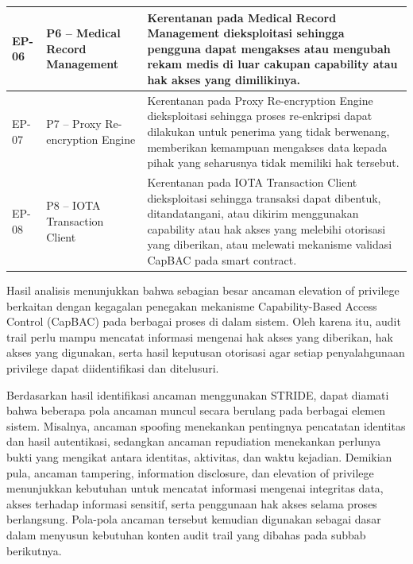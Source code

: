 \begin{xltabular}{\textwidth}{|>{\centering\arraybackslash}p{1.8cm}|>{\raggedright\arraybackslash}p{3.2cm}|X|}
    EP-06 &
    P6 -- Medical Record Management &
    Kerentanan pada Medical Record Management dieksploitasi sehingga pengguna dapat mengakses atau mengubah rekam medis di luar cakupan capability atau hak akses yang dimilikinya. \\
    \hline

    EP-07 &
    P7 -- Proxy Re-encryption Engine &
    Kerentanan pada Proxy Re-encryption Engine dieksploitasi sehingga proses re-enkripsi dapat dilakukan untuk penerima yang tidak berwenang, memberikan kemampuan mengakses data kepada pihak yang seharusnya tidak memiliki hak tersebut. \\
    \hline

    EP-08 &
    P8 -- IOTA Transaction Client &
    Kerentanan pada IOTA Transaction Client dieksploitasi sehingga transaksi dapat dibentuk, ditandatangani, atau dikirim menggunakan capability atau hak akses yang melebihi otorisasi yang diberikan, atau melewati mekanisme validasi CapBAC pada smart contract. \\
    \hline

\end{xltabular}

Hasil analisis menunjukkan bahwa sebagian besar ancaman elevation of privilege berkaitan dengan kegagalan penegakan mekanisme Capability-Based Access Control (CapBAC) pada berbagai proses di dalam sistem. Oleh karena itu, audit trail perlu mampu mencatat informasi mengenai hak akses yang diberikan, hak akses yang digunakan, serta hasil keputusan otorisasi agar setiap penyalahgunaan privilege dapat diidentifikasi dan ditelusuri.

Berdasarkan hasil identifikasi ancaman menggunakan STRIDE, dapat diamati bahwa beberapa pola ancaman muncul secara berulang pada berbagai elemen sistem. Misalnya, ancaman spoofing menekankan pentingnya pencatatan identitas dan hasil autentikasi, sedangkan ancaman repudiation menekankan perlunya bukti yang mengikat antara identitas, aktivitas, dan waktu kejadian. Demikian pula, ancaman tampering, information disclosure, dan elevation of privilege menunjukkan kebutuhan untuk mencatat informasi mengenai integritas data, akses terhadap informasi sensitif, serta penggunaan hak akses selama proses berlangsung. Pola-pola ancaman tersebut kemudian digunakan sebagai dasar dalam menyusun kebutuhan konten audit trail yang dibahas pada subbab berikutnya.